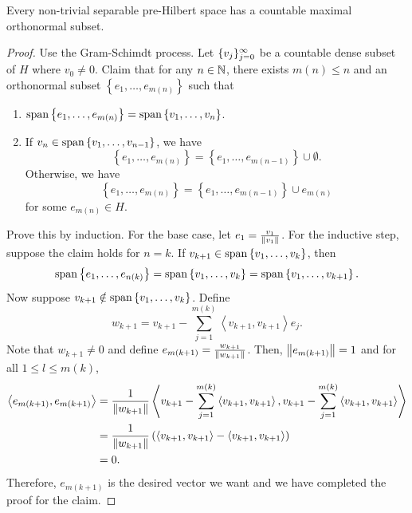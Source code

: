 \documentclass[a4paper]{article}
\renewcommand{\braket}[2]{\left\langle #1, #1 \right\rangle}
\begin{document}
\begin{thm}
  Every non-trivial separable pre-Hilbert space 
  has a countable maximal orthonormal subset.
\end{thm}

\begin{proof}
Use the Gram-Schimdt process.
Let $\{ v_j \}_{j=0}^\infty$ be a countable dense subset of $H$
where $v_0 \neq 0$. Claim that for any $n \in \mathbb{N}$, 
there exists $m(n) \leq n$ and an orthonormal subset 
$\left\{ e_1, \dots, e_{m(n)} \right\}$ such that 
\begin{enumerate}
  \item $\operatorname{span} \left\{ e_1, \dots, e_{m(n)} \right\} 
   = \operatorname{span} \left\{ v_1, \dots, v_n \right\}$.
  
  \item 
  If $v_n \in \operatorname{span} \left\{ v_1, \dots, v_{n-1} 
  \right\}$, we have 
  \[
    \left\{ e_1, \dots, e_{m(n)} \right\}  
    = \left\{ e_1, \dots, e_{m(n-1)} \right\} \cup 
    \emptyset.
  \]
  Otherwise, we have
  \[
    \left\{ e_1, \dots, e_{m(n)} \right\}  
    = \left\{ e_1, \dots, e_{m(n-1)} \right\} \cup 
    e_{m(n)}
  \]
  for some $e_{m(n)} \in H$.
\end{enumerate}
Prove this by induction. For the base case, 
let $e_1 = \frac{v_1}{\left\lVert v_1\right\rVert}$. 
For the inductive step, suppose the claim holds for 
$n = k$. If $v_{k+1} \in \operatorname{span} \left\{ v_1, \dots, v_k \right\}$,
then 
\[
\operatorname{span} \left\{ e_1, \dots, e_{n(k)} \right\}
= \operatorname{span} \left\{ v_1, \dots, v_k \right\} 
= \operatorname{span} \left\{ v_1, \dots, v_{k+1} \right\}.
\]
Now suppose $v_{k+1} \notin \operatorname{span} \left\{ v_1, \dots, v_k \right\}$.
Define 
\[
w_{k+1} = v_{k+1} - \sum_{j=1}^{m(k)} \braket{v_{k+1}}{e_j} e_j.
\]
Note that $w_{k+1} \neq 0$ and define $e_{m(k+1)} = 
\frac{w_{k+1}}{\left\lVert w_{k+1}\right\rVert}$. Then, $\left\lVert e_{m(k+1)}\right\rVert = 1$
and for all $1 \leq l \leq m(k)$, 
\[
\begin{aligned}
  \braket{e_{m(k+1)}}{e_l} 
  &= \frac{1}{\norm{w_{k+1}}}
  \braket{v_{k+1} - \sum_{j=1}^{m(k)} \braket{v_{k+1}}{e_j}}{e_l} \\
  &= \frac{1}{\norm{w_{k+1}}} 
  \left( \braket{v_{k+1}}{e_l} - \braket{v_{k+1}}{e_l} \right) \\
  &= 0.
\end{aligned}
\]
Therefore, $e_{m(k+1)}$ is the desired vector we want and 
we have completed the proof for the claim.


\end{proof}
\end{document}
